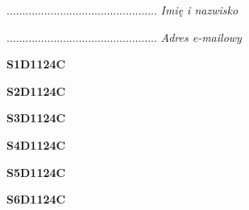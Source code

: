 \begin{turn}{90}\begin{minipage}{\linewidth} \vspace{20mm} ................................................  \textit{Imię i nazwisko}\end{minipage}\end{turn}

\begin{turn}{90}\begin{minipage}{\linewidth} \vspace{20mm} ................................................  \textit{Adres e-mailowy}\end{minipage}\end{turn}

\begin{turn}{90}\huge \begin{minipage}{\linewidth} \vspace{10mm}\textbf{S1D1124C}\end{minipage}\end{turn}

\begin{turn}{90}\huge \begin{minipage}{\linewidth} \vspace{10mm}\textbf{S2D1124C}\end{minipage}\end{turn}

\begin{turn}{90}\huge \begin{minipage}{\linewidth} \vspace{10mm}\textbf{S3D1124C}\end{minipage}\end{turn}

\begin{turn}{90}\huge \begin{minipage}{\linewidth} \vspace{10mm}\textbf{S4D1124C}\end{minipage}\end{turn}

\begin{turn}{90}\huge \begin{minipage}{\linewidth} \vspace{10mm}\textbf{S5D1124C}\end{minipage}\end{turn}

\begin{turn}{90}\huge \begin{minipage}{\linewidth} \vspace{10mm}\textbf{S6D1124C}\end{minipage}\end{turn}

